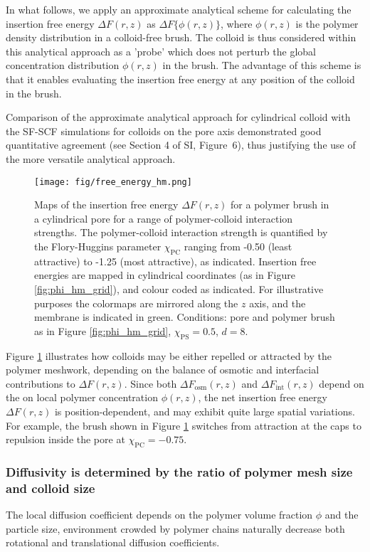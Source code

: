 \documentclass[12pt, a4paper]{article}
\begin{document}
In what follows, we apply an approximate analytical scheme for calculating the insertion free energy $\Delta F(r,z)$ as $\Delta F\{\phi(r,z)\}$, 
where $\phi(r,z)$ is the polymer density distribution in a colloid-free brush. 
The colloid is thus considered within this analytical approach as a 'probe' which does not perturb the global concentration distribution $\phi(r,z)$ in the brush. 
The advantage of this scheme is that it enables evaluating the insertion free energy at any position of the colloid in the brush.

Comparison of the approximate analytical approach for cylindrical colloid with the SF-SCF simulations for colloids on the pore axis demonstrated good quantitative agreement (see Section 4 of SI, Figure~6), 
thus justifying the use of the more versatile analytical approach.

\begin{figure}
    \centering
    \texttt{[image: fig/free\_energy\_hm.png]}
    \caption{
    Maps of the insertion free energy $\Delta F(r,z)$ for a polymer brush in a cylindrical pore for a range of polymer-colloid interaction strengths. 
    The polymer-colloid interaction strength is quantified by the Flory-Huggins parameter $\chi_{\text{PC}}$ ranging from -0.50 (least attractive) to -1.25 (most attractive), as indicated. 
    Insertion free energies are mapped in cylindrical coordinates (as in Figure \ref{fig:phi_hm_grid}), and colour coded as indicated. 
    For illustrative purposes the colormaps are mirrored along the $z$ axis, and the membrane is indicated in green. 
    Conditions: pore and polymer brush as in Figure \ref{fig:phi_hm_grid}, $\chi_{\text{PS}}=0.5$, $d=8$.
    }
    \label{fig:DeltaF_map}
\end{figure}

Figure \ref{fig:DeltaF_map} illustrates how colloids may be either repelled or attracted by the polymer meshwork, 
depending on the balance of osmotic and interfacial contributions to $\Delta F(r,z)$. 
Since both $\Delta F_{\text{osm}}(r,z)$ and $\Delta F_{\text{int}}(r,z)$ depend on the on local polymer concentration $\phi(r,z)$, 
the net insertion free energy $\Delta F(r,z)$ is position-dependent, and may exhibit quite large spatial variations. 
For example, the brush shown in Figure \ref{fig:DeltaF_map} switches from attraction at the caps to repulsion inside the pore at $\chi_{\text{PC}}=-0.75$.


\subsubsection{Diffusivity is determined by the ratio of polymer mesh size and colloid size}
The local diffusion coefficient depends on the polymer volume fraction $\phi$ and the particle size, environment crowded by polymer chains naturally decrease both rotational \cite{Fu2017} and translational \cite{Stewart1998} diffusion coefficients.
\end{document}
